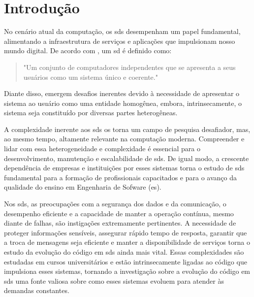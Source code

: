 

\chapter{Introdução}\label{cap:introducao}

No cenário atual da computação, os \gls{sds} desempenham um papel fundamental, alimentando a infraestrutura de serviços e aplicações que impulsionam nosso mundo digital. De acordo com , um \gls{sd} é definido como:

\begin{quote}"Um conjunto de computadores independentes que se apresenta a seus usuários como um sistema único e coerente." 
\end{quote}

Diante disso, emergem desafios inerentes devido à necessidade de apresentar o sistema ao usuário como uma entidade homogênea, embora, intrinsecamente, o sistema seja constituído por diversas partes heterogêneas.

A complexidade inerente aos \gls{sds} os torna um campo de pesquisa desafiador, mas, ao mesmo tempo, altamente relevante na computação moderna. Compreender e lidar com essa heterogeneidade e complexidade é essencial para o desenvolvimento, manutenção e escalabilidade de \gls{sds}. De igual modo, a crescente dependência de empresas e instituições por esses sistemas torna o estudo de \gls{sds} fundamental para a formação de profissionais capacitados e para o avanço da qualidade do ensino em Engenharia de Sofware (\gls{es}).

Nos \gls{sds}, as preocupações com a segurança dos dados e da comunicação, o desempenho eficiente e a capacidade de manter a operação contínua, mesmo diante de falhas, são instigações extremamente pertinentes. A necessidade de proteger informações sensíveis, assegurar rápido tempo de resposta, garantir que a troca de mensagens seja eficiente e manter a disponibilidade de serviços torna o estudo da evolução do código em \gls{sds} ainda mais vital. Essas complexidades são estudadas em cursos universitários e estão intrinsecamente ligadas ao código que impulsiona esses sistemas, tornando a investigação sobre a evolução do código em \gls{sds} uma fonte valiosa sobre como esses sistemas evoluem para atender às demandas constantes.

